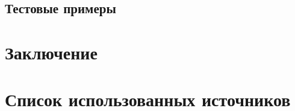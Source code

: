 \documentclass[14pt,a4paper]{extarticle}
\begin{document}
\subsection{Тестовые примеры}

\section{Заключение}




\section{Список использованных источников}
\section{}

\section{}
\end{document}
